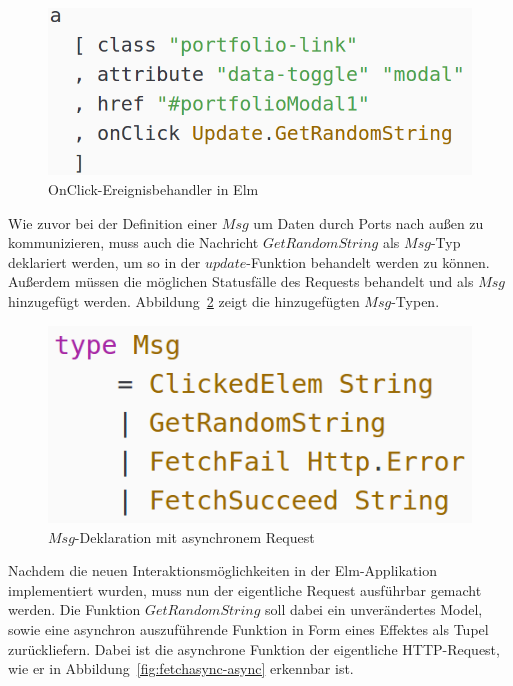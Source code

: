 \begin{figure}[h]
\centering
\includegraphics[scale=0.4]{img/portfolio-async.png}
\caption{OnClick-Ereignisbehandler in Elm}\label{fig:portfolio-async}
\end{figure}
Wie zuvor bei der Definition einer $Msg$ um Daten durch Ports nach außen zu kommunizieren, muss auch die Nachricht $GetRandomString$ als $Msg$-Typ deklariert werden, um so in der $update$-Funktion behandelt werden zu können. Außerdem müssen die möglichen Statusfälle des Requests behandelt und als $Msg$ hinzugefügt werden. Abbildung~\ref{fig:msg-async} zeigt die hinzugefügten $Msg$-Typen.
\begin{figure}[h]
\centering
\includegraphics[scale=0.5]{img/msg-async.png}
\caption{$Msg$-Deklaration mit asynchronem Request}\label{fig:msg-async}
\end{figure}
Nachdem die neuen Interaktionsmöglichkeiten in der Elm-Applikation implementiert wurden, muss nun der eigentliche Request ausführbar gemacht werden. Die Funktion $GetRandomString$ soll dabei ein unverändertes Model, sowie eine asynchron auszuführende Funktion in Form eines Effektes als Tupel zurückliefern. Dabei ist die asynchrone Funktion der eigentliche \ac{HTTP}-Request, wie er in Abbildung~\ref{fig:fetchasync-async} erkennbar ist.
